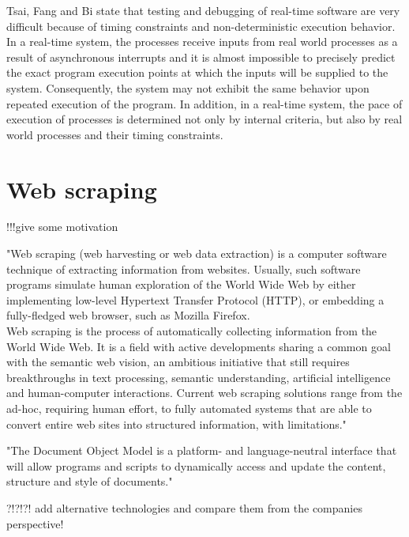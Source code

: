 Tsai, Fang and Bi\cite{rtSandD} state that testing and debugging of real-time software are very difficult because of timing constraints and non-deterministic execution behavior. In a real-time system, the processes receive inputs from real world processes as a result of asynchronous interrupts and it is almost impossible to precisely predict the exact program execution points at which the inputs will be supplied to the system. Consequently, the system may not exhibit the same behavior upon repeated execution of the program. In addition, in a real-time system, the pace of execution of processes is determined not only by internal criteria, but also by real world processes and their timing constraints.

\section{Web scraping}
!!!give some motivation

	"Web scraping (web harvesting or web data extraction) is a computer software technique of extracting information from websites. Usually, such software programs simulate human exploration of the World Wide Web by either implementing low-level Hypertext Transfer Protocol (HTTP), or embedding a fully-fledged web browser, such as Mozilla Firefox.\\

Web scraping is the process of automatically collecting information from the World Wide Web. It is a field with active developments sharing a common goal with the semantic web vision, an ambitious initiative that still requires breakthroughs in text processing, semantic understanding, artificial intelligence and human-computer interactions. Current web scraping solutions range from the ad-hoc, requiring human effort, to fully automated systems that are able to convert entire web sites into structured information, with limitations." \cite{wikiScraping}

"The Document Object Model is a platform- and language-neutral interface that will allow programs and scripts to dynamically access and update the content, structure and style of documents." \cite{w3cDOM}


?!?!?! add alternative technologies and compare them from the companies perspective!
